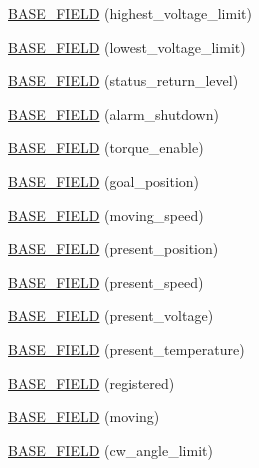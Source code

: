 \begin{DoxyCompactItemize}
\item 
\hyperlink{classdynamixel_1_1servos_1_1_base_servo_a012af5ca86e8020bf3bd95f2abed4bcd}{B\+A\+S\+E\+\_\+\+F\+I\+E\+L\+D} (highest\+\_\+voltage\+\_\+limit)
\item 
\hyperlink{classdynamixel_1_1servos_1_1_base_servo_ade5dee7e7e3029b7a9779b726f763112}{B\+A\+S\+E\+\_\+\+F\+I\+E\+L\+D} (lowest\+\_\+voltage\+\_\+limit)
\item 
\hyperlink{classdynamixel_1_1servos_1_1_base_servo_a1133c7f435ceb0d82542f609034c7b6a}{B\+A\+S\+E\+\_\+\+F\+I\+E\+L\+D} (status\+\_\+return\+\_\+level)
\item 
\hyperlink{classdynamixel_1_1servos_1_1_base_servo_a9b009f5190906b3851daf59d55b7cb8b}{B\+A\+S\+E\+\_\+\+F\+I\+E\+L\+D} (alarm\+\_\+shutdown)
\item 
\hyperlink{classdynamixel_1_1servos_1_1_base_servo_aa7c4e55ffcd9f798807d7192df7c9a11}{B\+A\+S\+E\+\_\+\+F\+I\+E\+L\+D} (torque\+\_\+enable)
\item 
\hyperlink{classdynamixel_1_1servos_1_1_base_servo_afa45f82edf10091dccc4cacf8731f466}{B\+A\+S\+E\+\_\+\+F\+I\+E\+L\+D} (goal\+\_\+position)
\item 
\hyperlink{classdynamixel_1_1servos_1_1_base_servo_a3319c8cbd3faf82f56f4b3d24a88007d}{B\+A\+S\+E\+\_\+\+F\+I\+E\+L\+D} (moving\+\_\+speed)
\item 
\hyperlink{classdynamixel_1_1servos_1_1_base_servo_a33900c9ece00c4a137d60a2084cdb05e}{B\+A\+S\+E\+\_\+\+F\+I\+E\+L\+D} (present\+\_\+position)
\item 
\hyperlink{classdynamixel_1_1servos_1_1_base_servo_a84ddc664e4dbd299a218d06f7cd77201}{B\+A\+S\+E\+\_\+\+F\+I\+E\+L\+D} (present\+\_\+speed)
\item 
\hyperlink{classdynamixel_1_1servos_1_1_base_servo_ab5167c0a8fec3502cac03b94d2724647}{B\+A\+S\+E\+\_\+\+F\+I\+E\+L\+D} (present\+\_\+voltage)
\item 
\hyperlink{classdynamixel_1_1servos_1_1_base_servo_adebb7ca3f7e87a284b9211d1f94a0dda}{B\+A\+S\+E\+\_\+\+F\+I\+E\+L\+D} (present\+\_\+temperature)
\item 
\hyperlink{classdynamixel_1_1servos_1_1_base_servo_a2c06de53ab5b5e8d910da1dfd172e4f5}{B\+A\+S\+E\+\_\+\+F\+I\+E\+L\+D} (registered)
\item 
\hyperlink{classdynamixel_1_1servos_1_1_base_servo_a46fc43c764852d3aa1a1b839b367af7c}{B\+A\+S\+E\+\_\+\+F\+I\+E\+L\+D} (moving)
\item 
\hyperlink{classdynamixel_1_1servos_1_1_base_servo_ad6f5dae7112bf5ada32bfcab4bdf2249}{B\+A\+S\+E\+\_\+\+F\+I\+E\+L\+D} (cw\+\_\+angle\+\_\+limit)

\end{DoxyCompactItemize}
